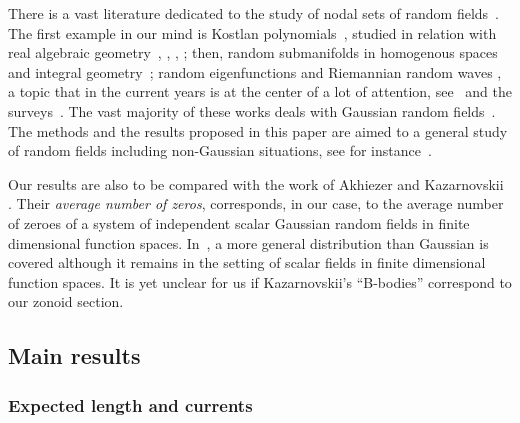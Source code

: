 \documentclass[AHL, Unicode, longabstracts, published]{cedram}
\begin{document}
There is a vast literature dedicated to the study of nodal sets of random fields~\cite{AdlerTaylor, AzaisWscheborbook, bogachev,marinucci_peccati_2011}. The first example in our mind is Kostlan polynomials~\cite{kostlan:93}, studied in relation with real algebraic geometry~\cite{shsm,ShSm1,ShSm3}, \cite{GaWe1,GaWe3,GaWe2}, \cite{NazarovSodin2009,NazarovSodin2016}, \cite{breiding2018geometry,basu2019random,FyLeLu,
kozhasov2020number,LeLu:gap,
Lerariolemniscate,stec2019MaxTyp}; then, random submanifolds in homogenous spaces and integral geometry~\cite{bernig2014integral,Brgisser2016ProbabilisticSC,
lerario2021probabilistic}; random eigenfunctions and Riemannian random waves \cite{Berry_1977,Zelditch2009RealAC}, a topic that in the current years is at the center of a lot of attention, see~\cite{CaHa2020,CammarotaM2015,CamMari2018Berry,Gass2020, Wig2013arith,WigYesha2021,MAFFUCCI2017,MaPeRoWi2015, MaRoWi2020Berry,MarRossVidotto2021,
MaWi2011defect, MaWi2011excarea, MaWi2014,  NourdinPeccatiRossi2019, WigRud2016, SarnakWigman2019, 
Wigman_2010}
and the surveys~\cite{canzani2019probabilistic, Ma2021surveyECS,WigSurvey2010,WigSurvey2022}. The vast majority of these works deals with Gaussian random fields~\cite{bogachev,dtgrf,Nicolaescu2016, NazarovSodin2016, NicSavale, MaxNotarnickHermite}. The methods and the results proposed in this paper are aimed to a general study of random fields including non-Gaussian situations, see for instance~\cite{KabluSartoWig2022,stecconi2021isotropic}.

Our results are also to be compared with the work of Akhiezer and Kazarnovskii \cite{KazaAveragezeroes}. Their \emph{average number of zeros}, corresponds, in our case, to the average number of zeroes of a system of independent scalar Gaussian random fields in finite dimensional function spaces. In~\cite{Kazarnovskii2020}, a more general distribution than Gaussian is covered although it remains in the setting of scalar fields in finite dimensional function spaces. It is yet unclear for us if Kazarnovskii's ``B-bodies'' correspond to our zonoid section.


\subsection{Main results}

\subsubsection{Expected length and currents}
\end{document}
